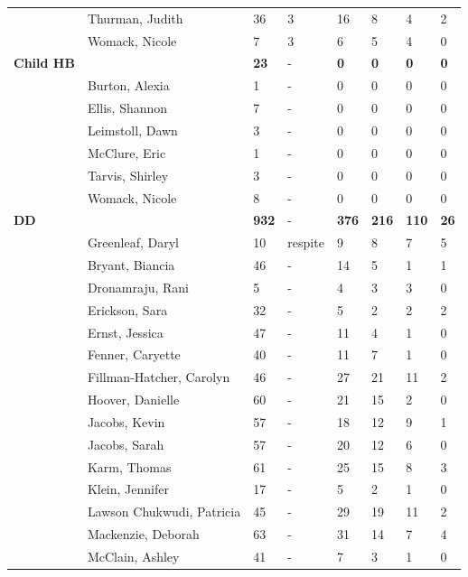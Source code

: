 \documentclass{article}\usepackage[]{graphicx}\usepackage[]{color}
\begin{document}
{\begin{longtable} { >{\raggedright}p{}p{}p{}p{}p{}p{}p{}p{}}
   & Thurman, Judith & 36 & 3 & 16 & 8 & 4 & 2 \\ 
   & Womack, Nicole & 7 & 3 & 6 & 5 & 4 & 0 \\ 
   \hline
\textbf{Child HB} &  & \textbf{23} & - & \textbf{0} & \textbf{0} & \textbf{0} & \textbf{0} \\ 
   \rowcolor[gray]{0.90} & Burton, Alexia & 1 & - & 0 & 0 & 0 & 0 \\ 
   \rowcolor[gray]{0.90} & Ellis, Shannon & 7 & - & 0 & 0 & 0 & 0 \\ 
   & Leimstoll, Dawn & 3 & - & 0 & 0 & 0 & 0 \\ 
   & McClure, Eric & 1 & - & 0 & 0 & 0 & 0 \\ 
   & Tarvis, Shirley & 3 & - & 0 & 0 & 0 & 0 \\ 
   \rowcolor[gray]{0.90} & Womack, Nicole & 8 & - & 0 & 0 & 0 & 0 \\ 
   \hline
\textbf{DD} &  & \textbf{932} & - & \textbf{376} & \textbf{216} & \textbf{110} & \textbf{26} \\ 
   \rowcolor[gray]{0.90} & Greenleaf, Daryl & 10 & respite & 9 & 8 & 7 & 5 \\ 
   & Bryant, Biancia & 46 & - & 14 & 5 & 1 & 1 \\ 
   & Dronamraju, Rani & 5 & - & 4 & 3 & 3 & 0 \\ 
   & Erickson, Sara & 32 & - & 5 & 2 & 2 & 2 \\ 
   \rowcolor[gray]{0.90} & Ernst, Jessica & 47 & - & 11 & 4 & 1 & 0 \\ 
   \rowcolor[gray]{0.90} & Fenner, Caryette & 40 & - & 11 & 7 & 1 & 0 \\ 
   \rowcolor[gray]{0.90} & Fillman-Hatcher, Carolyn & 46 & - & 27 & 21 & 11 & 2 \\ 
   & Hoover, Danielle & 60 & - & 21 & 15 & 2 & 0 \\ 
   & Jacobs, Kevin & 57 & - & 18 & 12 & 9 & 1 \\ 
   & Jacobs, Sarah & 57 & - & 20 & 12 & 6 & 0 \\ 
   \rowcolor[gray]{0.90} & Karm, Thomas & 61 & - & 25 & 15 & 8 & 3 \\ 
   \rowcolor[gray]{0.90} & Klein, Jennifer & 17 & - & 5 & 2 & 1 & 0 \\ 
   \rowcolor[gray]{0.90} & Lawson Chukwudi, Patricia & 45 & - & 29 & 19 & 11 & 2 \\ 
   & Mackenzie, Deborah & 63 & - & 31 & 14 & 7 & 4 \\ 
   & McClain, Ashley & 41 & - & 7 & 3 & 1 & 0 \\ 

\end{longtable}}
\end{document}
